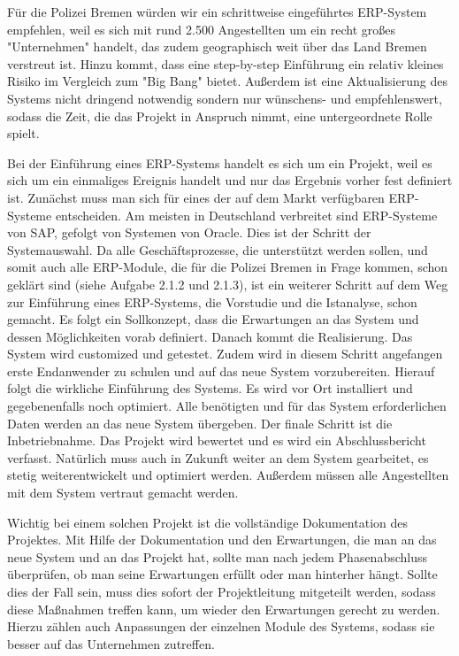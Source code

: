 \documentclass[12pt,utf8]{scrartcl}
\begin{document}
Für die Polizei Bremen würden wir ein schrittweise eingeführtes ERP-System empfehlen, weil es sich mit rund 2.500 Angestellten um ein recht großes "Unternehmen" handelt, das zudem geographisch weit über das Land Bremen verstreut ist\cite{PolizeiBremen}. Hinzu kommt, dass eine step-by-step Einführung ein relativ kleines Risiko im Vergleich zum "Big Bang" bietet. Außerdem ist eine Aktualisierung des Systems nicht dringend notwendig sondern nur wünschens- und empfehlenswert, sodass die Zeit, die das Projekt in Anspruch nimmt, eine untergeordnete Rolle spielt\cite{Hansmann2005}. 

Bei der Einführung eines ERP-Systems handelt es sich um ein Projekt, weil es sich um ein einmaliges Ereignis handelt und nur das Ergebnis vorher fest definiert ist. Zunächst muss man sich für eines der auf dem Markt verfügbaren ERP-Systeme entscheiden. Am meisten in Deutschland verbreitet sind ERP-Systeme von SAP, gefolgt von Systemen von Oracle\citep{Foerster2008}. Dies ist der Schritt der Systemauswahl. Da alle Geschäftsprozesse, die unterstützt werden sollen, und somit auch alle ERP-Module, die für die Polizei Bremen in Frage kommen, schon geklärt sind (siehe Aufgabe 2.1.2 und 2.1.3), ist ein weiterer Schritt auf dem Weg zur Einführung eines ERP-Systems, die Vorstudie und die Istanalyse, schon gemacht. Es folgt ein Sollkonzept, dass die Erwartungen an das System und dessen Möglichkeiten vorab definiert. Danach kommt die Realisierung. Das System wird customized und getestet. Zudem wird in diesem Schritt angefangen erste Endanwender zu schulen und auf das neue System vorzubereiten. Hierauf folgt die wirkliche Einführung des Systems. Es wird vor Ort installiert und gegebenenfalls noch optimiert. Alle benötigten und für das System erforderlichen Daten werden an das neue System übergeben. Der finale Schritt ist die Inbetriebnahme. Das Projekt wird bewertet und es wird ein Abschlussbericht verfasst. Natürlich muss auch in Zukunft weiter an dem System gearbeitet, es stetig weiterentwickelt und optimiert werden. Außerdem müssen alle Angestellten mit dem System vertraut gemacht werden\cite{Hansmann2005}.

Wichtig bei einem solchen Projekt ist die vollständige Dokumentation des Projektes. Mit Hilfe der Dokumentation und den Erwartungen, die man an das neue System und an das Projekt hat, sollte man nach jedem Phasenabschluss überprüfen, ob man seine Erwartungen erfüllt oder man hinterher hängt. Sollte dies der Fall sein, muss dies sofort der Projektleitung mitgeteilt werden, sodass diese Maßnahmen treffen kann, um wieder den Erwartungen gerecht zu werden\cite{Foerster2008}. Hierzu zählen auch Anpassungen der einzelnen Module des Systems, sodass sie besser auf das Unternehmen zutreffen. 
\end{document}
